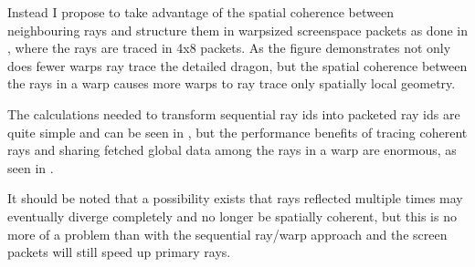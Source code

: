 Instead I propose to take advantage of the spatial coherence between
neighbouring rays and structure them in warpsized screenspace packets as done in
, where the rays are traced in 4x8 packets. As the
figure demonstrates not only does fewer warps ray trace the detailed dragon, but
the spatial coherence between the rays in a warp causes more warps to ray trace
only spatially local geometry.

\begin{figure}
  \hspace{20pt}
  \caption[Sequantial and spatially coherent rays per warp.]{}
\end{figure}

The calculations needed to transform sequential ray ids into packeted ray ids
are quite simple and can be seen in , but the performance
benefits of tracing coherent rays and sharing fetched global data among the rays
in a warp are enormous, as seen in .

It should be noted that a possibility exists that rays reflected multiple times
may eventually diverge completely and no longer be spatially coherent, but this
is no more of a problem than with the sequential ray/warp approach and the
screen packets will still speed up primary rays.

